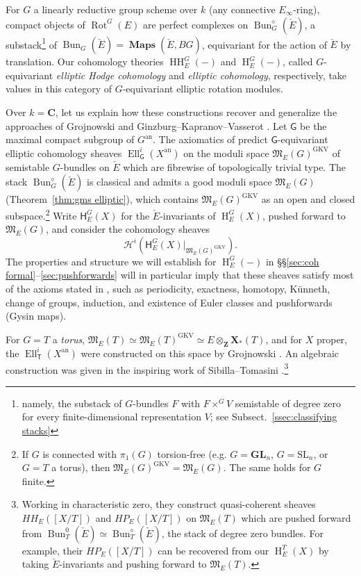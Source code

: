 \documentclass[12pt, oneside]{amsart}
\numberwithin{equation}{section}
\theoremstyle{remark}
\theoremstyle{plain}
\DeclareMathOperator{\MAP}{\mathbf{Maps}}
\newcommand{\frM}{\mathfrak{M}}
\newcommand{\GL}{\mathbf{GL}}
\newcommand{\bZ}{\mathbf{Z}}
\newcommand{\HH}{\operatorname{HH}}
\newcommand{\Hcoh}{\operatorname{H}}
\newcommand{\Bun}{\operatorname{Bun}}
\newcommand{\Rot}{\operatorname{Rot}}
\begin{document}
For $G$ a linearly reductive group scheme over $k$ (any connective $E_\infty$-ring), compact objects of $\Rot^G(E)$ are perfect complexes on $\Bun_G^\diamond(\check{E})$, a substack\footnote{%
  namely, the substack of $G$-bundles $F$ with $F \times^G V$ semistable of degree zero for every finite-dimensional representation $V$; see Subsect.~\ref{ssec:classifying stacks}
} of $\Bun_G(\check{E}) = \MAP(\check{E}, BG)$, equivariant for the action of $\check{E}$ by translation.
Our cohomology theories $\HH_E^G(-)$ and $\Hcoh_E^G(-)$, called $G$-equivariant \emph{elliptic Hodge cohomology} and \emph{elliptic cohomology}, respectively, take values in this category of $G$-equivariant elliptic rotation modules.

Over $k=\mathbf{C}$, let us explain how these constructions recover and generalize the approaches of Grojnowski \cite{Gr} and Ginzburg--Kapranov--Vasserot \cite{GKV}.
Let $\mathsf{G}$ be the maximal compact subgroup of $G^{\mathrm{an}}$.
The axiomatics of \cite{GKV} predict $\mathsf{G}$-equivariant elliptic cohomology sheaves $\operatorname{Ell}_{\mathsf{G}}^i(X^{\mathrm{an}})$ on the moduli space $\frM_E(G)^{\mathrm{GKV}}$ of semistable $G$-bundles on $\check{E}$ which are fibrewise of topologically trivial type.
The stack $\Bun_G^\diamond(\check{E})$ is classical and admits a good moduli space $\frM_E(G)$ (Theorem~\ref{thm:gms elliptic}), which contains $\frM_E(G)^{\mathrm{GKV}}$ as an open and closed subspace.\footnote{%
  If $G$ is connected with $\pi_1(G)$ torsion-free (e.g. $G=\GL_n$, $G=\mathrm{SL}_n$, or $G=T$ a torus), then $\frM_E(G)^{\mathrm{GKV}} = \frM_E(G)$.
  The same holds for $G$ finite.
}
Write $\mathsf{H}_E^G(X)$ for the $\check{E}$-invariants of $\Hcoh_E^G(X)$, pushed forward to $\frM_E(G)$, and consider the cohomology sheaves
\[ \mathcal{H}^i(\mathsf{H}_E^G(X)|_{\frM_E(G)^{\mathrm{GKV}}}). \]
The properties and structure we will establish for $\Hcoh_E^G(-)$ in \S\S \ref{sec:coh formal}--\ref{sec:pushforwards} will in particular imply that these sheaves satisfy most of the axioms stated in \cite{GKV}, such as periodicity, exactness, homotopy, K\"unneth, change of groups, induction, and existence of Euler classes and pushforwards (Gysin maps).

For $G = T$ a \emph{torus}, $\frM_E(T) \simeq \frM_E(T)^{\mathrm{GKV}} \simeq E \otimes_{\bZ} \mathbf{X}_*(T)$, and for $X$ proper, the $\operatorname{Ell}_{\mathsf{T}}^i(X^\mathrm{an})$ were constructed on this space by Grojnowski \cite{Gr}.
An algebraic construction was given in the inspiring work of Sibilla--Tomasini \cite{ST}.\footnote{%
  Working in characteristic zero, they construct quasi-coherent sheaves $HH_E([X/T])$ and $HP_E([X/T])$ on $\frM_E(T)$ which are pushed forward from $\Bun_T^0(\check{E}) \simeq \Bun_T^\diamond(\check{E})$, the stack of degree zero bundles.
  For example, their $HP_E([X/T])$ can be recovered from our $\Hcoh_E^T(X)$ by taking $\check{E}$-invariants and pushing forward to $\frM_E(T)$.
}
\end{document}
